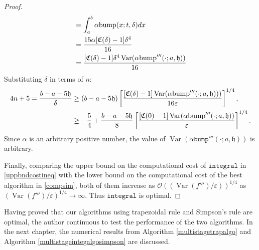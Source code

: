 \documentclass{iitthesis}
\DeclareMathOperator{\Var}{Var}
\theoremstyle{definition}
\theoremstyle{remark}
\begin{document}
\begin{proof}
\begin{subequations}
\begin{align*}
     &=\int_{a}^{b}\alpha\textup{bump}(x;t,\delta)dx\\
     &=\frac{15\alpha[\mathfrak{C}(\delta)-1]\delta^4}{16}\\
     &=\frac{[\mathfrak{C}(\delta)-1]\delta^4\Var(\alpha\textup{bump}'''(\cdot;a,\mathfrak{h}))}{16}
  \end{align*}
  \end{subequations}
  Substituting $\delta$  in terms of $n$:
      \begin{align*}
        4n+5=\frac{b-a-5\mathfrak{h}}{\delta}&\ge(b-a-5\mathfrak{h})\left[\frac{[\mathfrak{C}(\delta)-1]\Var(\alpha \textup{bump}'''(\cdot;a,\mathfrak{h})))}{16\varepsilon}\right]^{1/4},\\
        &\ge-\frac{5}{4}+\frac{b-a-5\mathfrak{h}}{8}\left[\frac{[\mathfrak{C}(0)-1]\Var(\alpha \textup{bump}'''(\cdot;a,\mathfrak{h}))}{\varepsilon}\right]^{1/4}.
    \end{align*}
    Since $\alpha$ is an arbitrary positive number, the value of $\Var(\alpha \texttt{bump}'''(\cdot;a,\mathfrak{h}))$ is arbitrary.

    Finally, comparing the upper bound on the computational cost of $\texttt{integral}$ in \eqref{uppbndcostineq} with the lower bound on the computational cost of the best algorithm in \eqref{compsim}, both of them increase as $\mathcal{O}((\Var(f''')/\varepsilon))^{1/4}$ as $(\Var(f''')/\varepsilon)^{1/4}\rightarrow \infty$. Thus $\texttt{integral}$ is optimal.
\end{proof}

Having proved that our algorithms using trapezoidal rule and Simpson's rule are optimal, the author continuous to test the performance of the two algorithms. In the next chapter, the numerical results from Algorithm \ref{multistagetrapalgo} and Algorithm \ref{multistageintegalgosimpson} are discussed.

\end{document}
